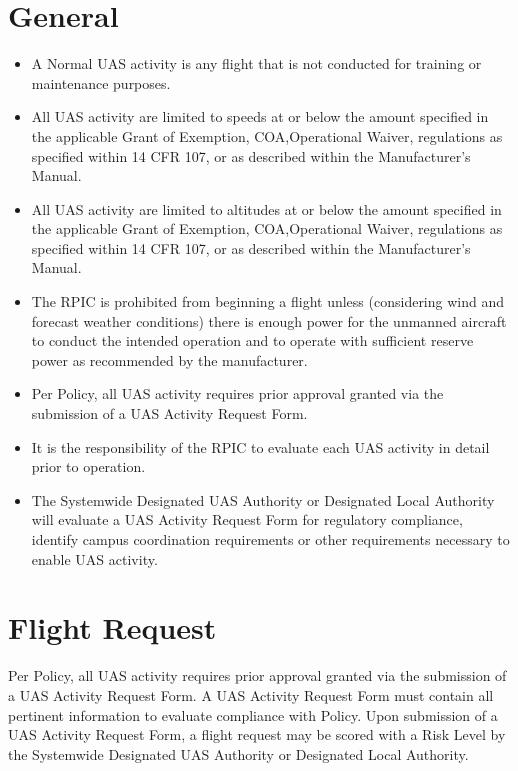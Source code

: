 \documentclass[
]{book}
\providecommand{\tightlist}{%
  \setlength{\itemsep}{0pt}\setlength{\parskip}{0pt}}
\begin{document}
\section{General}\label{general}

\begin{itemize}
\tightlist
\item
  A Normal UAS activity is any flight that is not conducted for training or maintenance purposes.
\item
  All UAS activity are limited to speeds at or below the amount specified in the applicable Grant of Exemption, COA,Operational Waiver, regulations as specified within 14 CFR 107, or as described within the Manufacturer's Manual.
\item
  All UAS activity are limited to altitudes at or below the amount specified in the applicable Grant of Exemption, COA,Operational Waiver, regulations as specified within 14 CFR 107, or as described within the Manufacturer's Manual.
\item
  The RPIC is prohibited from beginning a flight unless (considering wind and forecast weather conditions) there is enough power for the unmanned aircraft to conduct the intended operation and to operate with sufficient reserve power as recommended by the manufacturer.
\item
  Per Policy, all UAS activity requires prior approval granted via the submission of a UAS Activity Request Form.
\item
  It is the responsibility of the RPIC to evaluate each UAS activity in detail prior to operation.
\item
  The Systemwide Designated UAS Authority or Designated Local Authority will evaluate a UAS Activity Request Form for regulatory compliance, identify campus coordination requirements or other requirements necessary to enable UAS activity.
\end{itemize}

\section{Flight Request}\label{flight-request}

Per Policy, all UAS activity requires prior approval granted via the submission of a UAS Activity Request Form. A UAS Activity Request Form must contain all pertinent information to evaluate compliance with Policy. Upon submission of a UAS Activity Request Form, a flight request may be scored with a Risk Level by the Systemwide Designated UAS Authority or Designated Local Authority.
\end{document}

